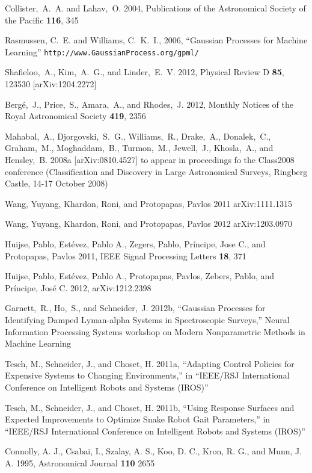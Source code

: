 \documentclass[prd,nofootbib,floatfix,11pt,tightenlines,nofootinbib]{revtex4}
\begin{document}
\begin{thebibliography}{99}
Collister,~A.~A. and Lahav,~O. 2004,
Publications of the Astronomical Society of the Pacific {\bf 116}, 345

Rasmussen, C.~E. and Williams, C.~K.~I., 2006, ``Gaussian
Processes for Machine Learning''
\verb|http://www.GaussianProcess.org/gpml/|

Shafieloo,~A., Kim,~A.~G., and Linder,~E.~V. 2012,
Physical Review D {\bf 85}, 123530 [arXiv:1204.2272]

Berg\'e,~J., Price,~S., Amara,~A., and Rhodes,~J. 2012,
Monthly Notices of the Royal Astronomical Society {\bf 419}, 2356

Mahabal,~A., Djorgovski,~S.~G., Williams,~R., Drake,~A., Donalek,~C.,
Graham,~M., Moghaddam,~B., Turmon,~M., Jewell,~J., Khosla,~A., and
Hensley,~B. 2008a [arXiv:0810.4527] to appear in proceedings fo the Class2008
conference (Classification and Discovery in Large Astronomical Surveys, Ringberg
Castle, 14-17 October 2008)

Wang, Yuyang, Khardon, Roni, and Protopapas, Pavlos 2011
arXiv:1111.1315

Wang, Yuyang, Khardon, Roni, and Protopapas, Pavlos 2012
arXiv:1203.0970

Huijse, Pablo, Est\'evez, Pablo A., Zegers, Pablo, Pr\'incipe, Jose C.,
and Protopapas, Pavlos 2011, IEEE Signal Processing Letters {\bf 18}, 371

Huijse, Pablo, Est\'evez, Pablo A., Protopapas, Pavlos, Zebers, Pablo,
and Pr\'incipe, Jos\'e C. 2012, arXiv:1212.2398

Garnett,~R., Ho,~S., and Schneider,~J. 2012b,
``Gaussian Processes for Identifying Damped Lyman-alpha Systems in Spectroscopic
Surveys,'' Neural Information Processing Systems 
workshop on Modern Nonparametric Methods in Machine Learning

Tesch, M., Schneider, J., and Choset, H. 2011a,
``Adapting Control Policies for Expensive Systems to Changing Environments,'' in
``IEEE/RSJ International Conference on Intelligent Robots and Systems (IROS)''

Tesch, M., Schneider, J., and Choset, H. 2011b,
``Using Response Surfaces and Expected Improvements to Optimize 
Snake Robot Gait Parameters,''
in
``IEEE/RSJ International Conference on Intelligent Robots and Systems (IROS)''


Connolly, A. J., Csabai, I., Szalay, A. S., Koo, D. C., Kron, R. G.,
and Munn, J. A. 1995, Astronomical Journal {\bf 110} 2655


\end{thebibliography}
\end{document}
